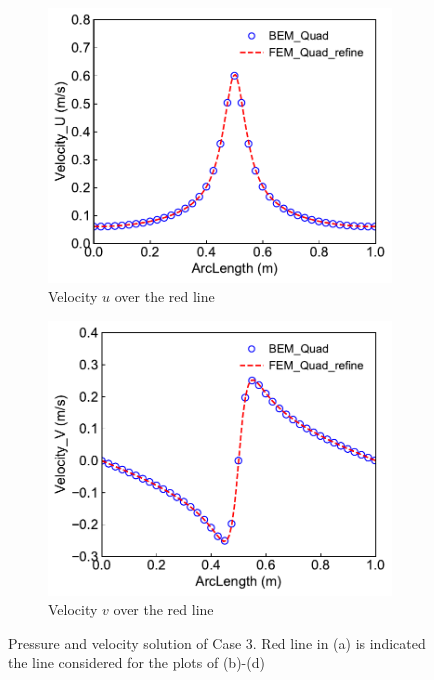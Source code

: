 \documentclass[num-refs]{wiley-networks}
\begin{document}
\begin{figure}
\begin{subfigure}[b]{0.4\textwidth}
         \centering
         \includegraphics[width=\textwidth]{Case3_VelocityYOverLine_U.pdf}
         \caption{Velocity $u$ over the red line}
     \end{subfigure}
\quad
     \begin{subfigure}[b]{0.4\textwidth}
         \centering
         \includegraphics[width=\textwidth]{Case3_VelocityYOverLine_V.pdf}
         \caption{Velocity $v$ over the red line}
     \end{subfigure}
\label{fig:Case3_Solution}
\caption{Pressure and velocity solution of Case 3. Red line in (a) is indicated the line considered for the plots of (b)-(d)}
\end{figure}
\end{document}
